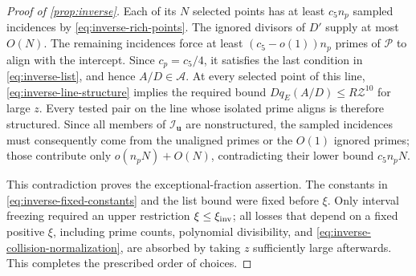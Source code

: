 \begin{proof}[Proof of \cref{prop:inverse}]
Each of its \(N\) selected points has at least \(c_5n_p\)
sampled incidences by \eqref{eq:inverse-rich-points}.
The ignored divisors of \(D'\) supply at most \(O(N)\).
The remaining incidences force at least
\((c_5-o(1))n_p\) primes of \(\mathcal P\) to align with the intercept.
Since \(c_p=c_5/4\), it satisfies the last condition in
\eqref{eq:inverse-list}, and hence \(A/D\in\mathcal A\).
At every selected point of this line,
\eqref{eq:inverse-line-structure} implies the required bound
\(Dq_E(A/D)\le R\mathcal Z^{10}\) for large \(z\).
Every tested pair on the line whose isolated prime aligns is therefore
structured. Since all members of \(\mathcal I_{\mathbf u}\) are
nonstructured, the sampled incidences must consequently come from the
unaligned primes or the \(O(1)\) ignored primes; those
contribute only \(o(n_pN)+O(N)\), contradicting their lower bound
\(c_5n_pN\).

This contradiction proves the exceptional-fraction assertion.
The constants in \eqref{eq:inverse-fixed-constants} and the list bound
were fixed before \(\xi\).
Only interval freezing required an upper restriction
\(\xi\le\xi_{\rm inv}\); all losses that depend on a fixed positive
\(\xi\), including prime counts, polynomial divisibility, and
\eqref{eq:inverse-collision-normalization}, are absorbed by taking
\(z\) sufficiently large afterwards.
This completes the prescribed order of choices.
\end{proof}
